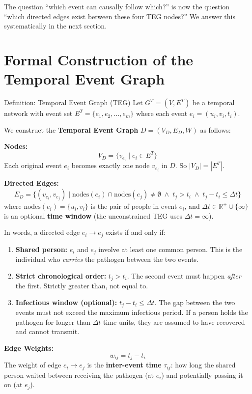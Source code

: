The question ``which event can causally follow which?'' is now the question
``which directed edges exist between these four TEG nodes?'' We answer this
systematically in the next section.

\section{Formal Construction of the Temporal Event Graph}
\label{sec:teg_construction}

\begin{mathbox}{Definition: Temporal Event Graph (TEG)}
Let $G^T = (V, E^T)$ be a temporal network with event set
$E^T = \{e_1, e_2, \dots, e_m\}$ where each event $e_i = (u_i, v_i, t_i)$.

We construct the \textbf{Temporal Event Graph} $D = (V_D, E_D, W)$ as follows:

\medskip
\noindent\textbf{Nodes:}
\[
    V_D = \{ v_{e_i} \mid e_i \in E^T \}
\]
Each original event $e_i$ becomes exactly one node $v_{e_i}$ in $D$. So
$|V_D| = |E^T|$.

\medskip
\noindent\textbf{Directed Edges:}
\[
    E_D = \{ (v_{e_i}, v_{e_j}) \mid \text{nodes}(e_i) \cap \text{nodes}(e_j)
    \neq \emptyset \; \wedge \; t_j > t_i \; \wedge \; t_j - t_i \le \Delta t \}
\]
where $\text{nodes}(e_i) = \{u_i, v_i\}$ is the pair of people in event $e_i$,
and $\Delta t \in \mathbb{R}^+ \cup \{\infty\}$ is an optional \textbf{time
window} (the unconstrained TEG uses $\Delta t = \infty$).

In words, a directed edge $e_i \to e_j$ exists if and only if:
\begin{enumerate}[noitemsep]
    \item \textbf{Shared person:} $e_i$ and $e_j$ involve at least one common
          person. This is the individual who \emph{carries} the pathogen between
          the two events.
    \item \textbf{Strict chronological order:} $t_j > t_i$. The second event
          must happen \emph{after} the first. Strictly greater than, not
          equal to.
    \item \textbf{Infectious window (optional):} $t_j - t_i \le \Delta t$. The
          gap between the two events must not exceed the maximum infectious
          period. If a person holds the pathogen for longer than $\Delta t$ time
          units, they are assumed to have recovered and cannot transmit.
\end{enumerate}

\medskip
\noindent\textbf{Edge Weights:}
\[
    w_{ij} = t_j - t_i
\]
The weight of edge $e_i \to e_j$ is the \textbf{inter-event time} $\tau_{ij}$:
how long the shared person waited between receiving the pathogen (at $e_i$) and
potentially passing it on (at $e_j$).
\end{mathbox}

